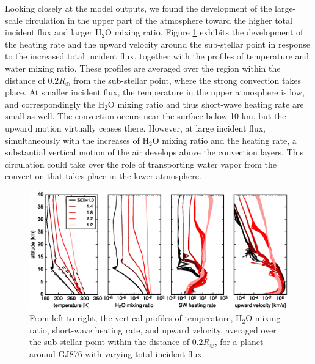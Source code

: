 \documentclass[11pt,numberedappendix,twocolappendix,]{emulateapj}
\def\water{H$_2$O }
\begin{document}
Looking closely at the model outputs, we found the development of the large-scale circulation in the upper part of the atmosphere toward the higher total incident flux and larger \water mixing ratio. 
Figure \ref{fig:AqOH0TLS_GJ876_temp_xH2O_vz_heat} exhibits the development of the heating rate and the upward velocity around the sub-stellar point in response to the increased total incident flux, together with the profiles of temperature and water mixing ratio. 
These profiles are averaged over the region within the distance of $0.2R_{\oplus }$ from the sub-stellar point, where the strong convection takes place. 
%
At smaller incident flux, the temperature in the upper atmosphere is low, and correspondingly the \water mixing ratio and thus short-wave heating rate are small as well. 
The convection occurs near the surface below 10 km, but the upward motion virtually ceases there. 
%
However, at large incident flux, simultaneously with the increases of \water mixing ratio and the heating rate, a substantial vertical motion of the air develops above the convection layers. 
This circulation could take over the role of transporting water vapor from the convection that takes place in the lower atmosphere. 


\begin{figure}[htb]
    \begin{center}
    \includegraphics[width=0.8\hsize]{fig/AqOH0TLS_GJ876_temp_xH2O_vz_heat.eps}
    \end{center}
\caption{From left to right, the vertical profiles of temperature, \water mixing ratio, short-wave heating rate, and upward velocity, averaged over the sub-stellar point within the distance of $0.2R_{\oplus }$, for a planet around GJ876 with varying total incident flux. }                                                                                                             
\label{fig:AqOH0TLS_GJ876_temp_xH2O_vz_heat}
\end{figure}
\end{document}
